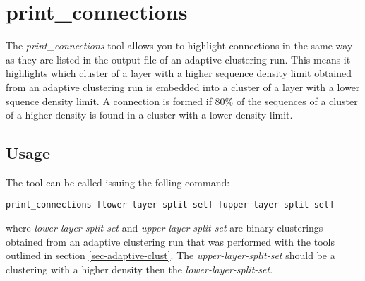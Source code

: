 \section{print\_connections}

The \emph{print\_connections} tool allows you to highlight
connections in the same way as they are listed in the output file of an adaptive
clustering run. This means it highlights which cluster of a layer with
a higher sequence density limit obtained from  an adaptive clustering
run is embedded into a cluster of a layer with a lower squence density
limit. A connection is formed if 80\% of the sequences of a cluster of
a higher density is found in a cluster with a lower density limit. 

\subsection{Usage}

The tool can be called issuing the folling command:
\begin{lstlisting}
print_connections [lower-layer-split-set] [upper-layer-split-set]
\end{lstlisting}
where \emph{lower-layer-split-set} and \emph{upper-layer-split-set}
are binary clusterings obtained from an adaptive clustering run that
was performed with the tools outlined in section \ref{sec-adaptive-clust}. The
\emph{upper-layer-split-set} should be a clustering with a higher
density then the \emph{lower-layer-split-set}. 

